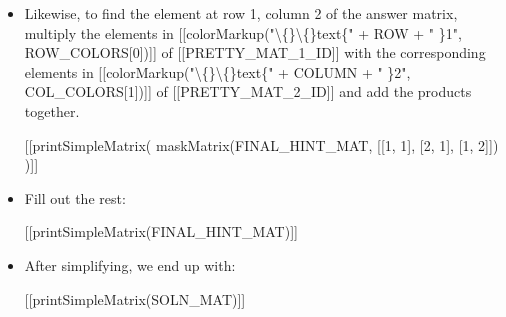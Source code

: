 \documentclass{article}
\begin{document}
\begin{itemize}
            
                
                    [[printSimpleMatrix(
                            maskMatrix(FINAL\_HINT\_MAT, [[1, 1], [2, 1]])
                        )]]
  \item Likewise, to find the element at row 1, column 2 of the answer matrix, multiply the elements in [[colorMarkup("\textbackslash\{\}\textbackslash\{\}text\{" + ROW + " \}1", ROW\_COLORS[0])]] of [[PRETTY\_MAT\_1\_ID]] with the corresponding elements in [[colorMarkup("\textbackslash\{\}\textbackslash\{\}text\{" + COLUMN + " \}2", COL\_COLORS[1])]] of [[PRETTY\_MAT\_2\_ID]] and add the products together.
            
            
                
                    [[printSimpleMatrix(
                            maskMatrix(FINAL\_HINT\_MAT, [[1, 1], [2, 1], [1, 2]])
                        )]]
  \item Fill out the rest:
            
            
                
                    [[printSimpleMatrix(FINAL\_HINT\_MAT)]]
  \item After simplifying, we end up with:
            
                
                    [[printSimpleMatrix(SOLN\_MAT)]]
\end{itemize}
\end{document}
